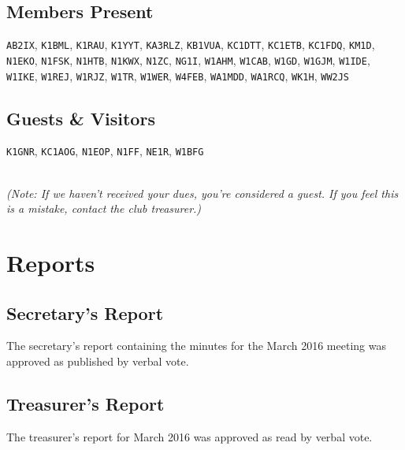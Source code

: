 \documentclass[10pt,letterpaper]{article}
\begin{document}
\subsection{Members Present}

\texttt{AB2IX},
\texttt{K1BML},
\texttt{K1RAU},
\texttt{K1YYT},
\texttt{KA3RLZ},
\texttt{KB1VUA},
\texttt{KC1DTT},
\texttt{KC1ETB},
\texttt{KC1FDQ},
\texttt{KM1D},
\texttt{N1EKO},
\texttt{N1FSK},
\texttt{N1HTB},
\texttt{N1KWX},
\texttt{N1ZC},
\texttt{NG1I},
\texttt{W1AHM},
\texttt{W1CAB},
\texttt{W1GD},
\texttt{W1GJM},
\texttt{W1IDE},
\texttt{W1IKE},
\texttt{W1REJ},
\texttt{W1RJZ},
\texttt{W1TR},
\texttt{W1WER},
\texttt{W4FEB},
\texttt{WA1MDD},
\texttt{WA1RCQ},
\texttt{WK1H},
\texttt{WW2JS}

\subsection{Guests \& Visitors}

\texttt{K1GNR},
\texttt{KC1AOG},
\texttt{N1EOP},
\texttt{N1FF},
\texttt{NE1R},
\texttt{W1BFG}

\noindent\\
\emph{(Note: If we haven't received your dues, you're considered a guest. If you feel this is a mistake, contact the club treasurer.)}

\section{Reports}

\subsection{Secretary's Report}

The secretary's report containing the minutes for the March 2016 meeting was approved as published by verbal vote.

\newpage
\subsection{Treasurer's Report}

The treasurer's report for March 2016 was approved as read by verbal vote.
\end{document}
